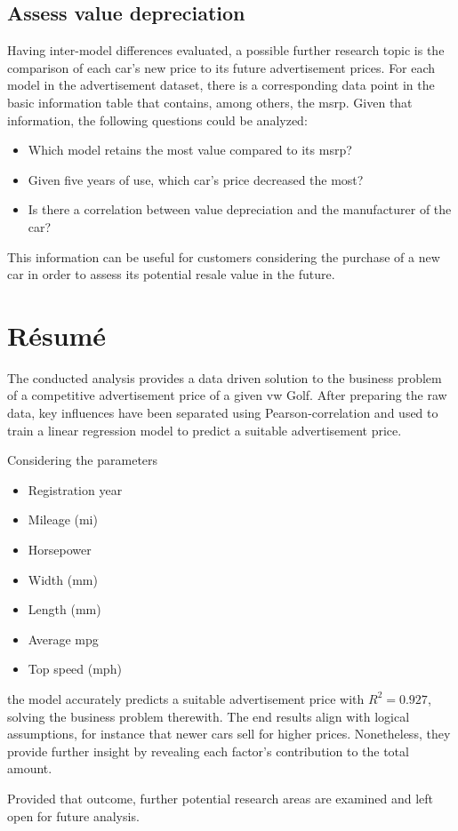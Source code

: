 \subsection{Assess value depreciation}
Having inter-model differences evaluated, a possible further research topic is the comparison of each car's new price
to its future advertisement prices. For each model in the advertisement dataset, there is a corresponding data point
in the basic information table that contains, among others, the \ac{msrp}. 
\newline
Given that information, the following questions could be analyzed: 
\begin{itemize}
\item Which model retains the most value compared to its \ac{msrp}?
\item Given five years of use, which car's price decreased the most?
\item Is there a correlation between value depreciation and the manufacturer of the car?
\end{itemize}
This information can be useful for customers considering the purchase of a new car in order to assess its potential resale value in the future.

\section{Résumé}

The conducted analysis provides a data driven solution to the business problem of a competitive advertisement price of a given \ac{vw} Golf.
After preparing the raw data, key influences have been separated using Pearson-correlation and used to train a linear regression model to
predict a suitable advertisement price.
\par
Considering the parameters 
\begin{itemize}
    \item Registration year
    \item Mileage (mi)
    \item Horsepower
    \item Width (mm)
    \item Length (mm)
    \item Average mpg
    \item Top speed (mph)
\end{itemize}
the model accurately predicts a suitable advertisement price with $R^2 = 0.927$, solving the business problem therewith.
The end results align with logical assumptions, for instance that newer cars sell for higher prices.
Nonetheless, they provide further insight by revealing each factor's contribution to the total amount.
\par
Provided that outcome, further potential research areas are examined and left open for future analysis. 



